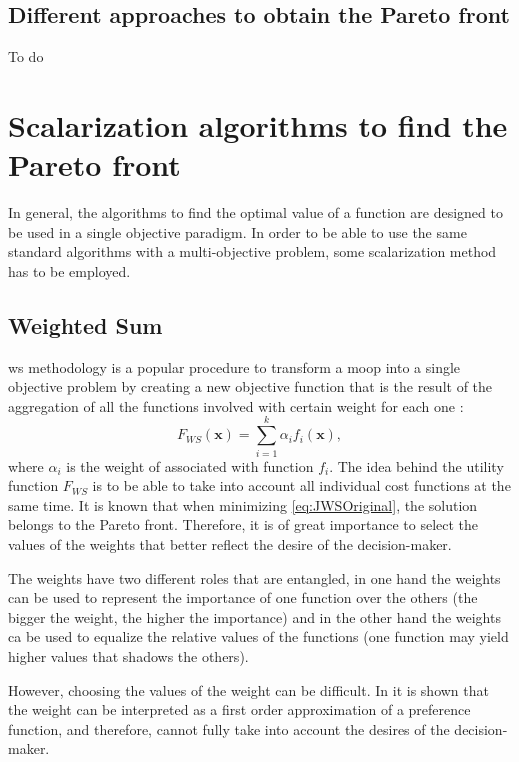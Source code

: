 \subsection{Different approaches to obtain the Pareto front}
To do
\section{Scalarization algorithms to find the Pareto front}
\label{sec:design-methodologies}

In general, the algorithms to find the optimal value of a function are designed to be used in a single objective paradigm. In order to be able to use the same standard algorithms with a multi-objective problem, some scalarization method has to be employed.
%
\subsection{Weighted Sum}
\label{sec:WS}
\gls{ws} methodology is a popular procedure to transform a \gls{moop} into a single objective problem by creating a new objective function that is the result of the aggregation of all the functions involved with certain weight for each one \citep{Marler2004}:
%
\begin{equation}
F_{WS}(\mathbf{x}) = \sum_{i=1}^{k}\alpha_{i} {f}_{i}(\mathbf{x}),
\label{eq:JWSOriginal}
\end{equation}
%
where $\alpha_i$ is the weight of associated with function $f_i$. The idea behind the utility function $F_{WS}$ is to be able to take into account all individual cost functions at the same time. It is known that when minimizing \eqref{eq:JWSOriginal}, the solution belongs to the Pareto front. Therefore, it is of great importance to select the values of the weights that better reflect the desire of the decision-maker.

The weights have two different roles that are entangled, in one hand the weights can be used to represent the importance of one function over the others (the bigger the weight, the higher the importance) and in the other hand the weights ca be used to equalize the relative values of the functions (one function may yield higher values that shadows the others).

However, choosing the values of the weight can be difficult. In \citet{Marler2010} it is shown that the weight can be interpreted as a first order approximation of a preference function, and therefore, cannot fully take into account the desires of the decision-maker.

